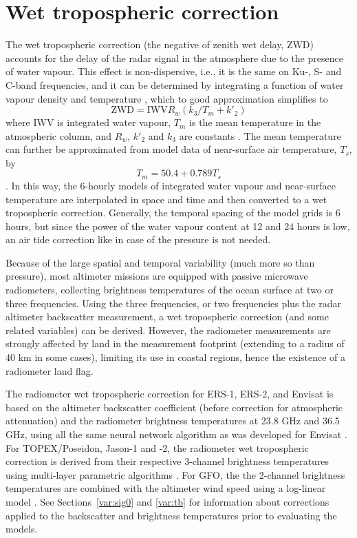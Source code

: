 \documentclass[a4paper,11pt,openany,natbib]{thesis}
\begin{document}
\section{Wet tropospheric correction}
\label{var:wet_tropo}
The wet tropospheric correction (the negative of zenith wet delay, ZWD) accounts for the delay of the radar signal in the atmosphere due to the presence of water vapour. This effect is non-dispersive, i.e., it is the same on Ku-, S- and C-band frequencies, and it can be determined by integrating a function of water vapour density and temperature \citep[e.g.,][]{askne1987}, which to good approximation simplifies to
$$ \mathrm{ZWD} = \mathrm{IWV} R_w (k_3 / T_m + k'_2) $$
where IWV is integrated water vapour, $T_m$ is the mean temperature in the atmospheric column, and $R_w$, $k'_2$ and $k_3$ are constants \citep{bevis1994}. The mean temperature can further be approximated from model data of near-surface air temperature, $T_s$, by
$$ T_m = 50.4 + 0.789 T_s$$
\citep{mendes2000}. In this way, the 6-hourly models of integrated water vapour and near-surface temperature are interpolated in space and time and then converted to a wet tropospheric correction.
Generally, the temporal spacing of the model grids is 6 hours, but since the power of the water vapour content at 12 and 24 hours is low, an air tide correction like in case of the pressure is not needed.

Because of the large spatial and temporal variability (much more so than pressure), most altimeter missions are equipped with passive microwave radiometers, collecting brightness temperatures of the ocean surface at two or three frequencies. Using the three frequencies, or two frequencies plus the radar altimeter backscatter measurement, a wet tropospheric correction (and some related variables) can be derived. However, the radiometer measurements are strongly affected by land in the measurement footprint (extending to a radius of 40 km in some cases), limiting its use in coastal regions, hence the existence of a radiometer land flag.

The radiometer wet tropospheric correction for ERS-1, ERS-2, and Envisat is based on the altimeter backscatter coefficient (before correction for atmospheric attenuation) and the radiometer brightness temperatures at 23.8 GHz and 36.5 GHz, using all the same neural network algorithm as was developed for Envisat \citep{labroue2003}. For TOPEX/Poseidon, Jason-1 and -2, the radiometer wet tropospheric correction is derived from their respective 3-channel brightness temperatures using multi-layer parametric algorithms  \citep{ruf1995c,dumont2001}. For GFO, the the 2-channel brightness temperatures are combined with the altimeter wind speed using a log-linear model \citep{ruf1996}. See Sections~\ref{var:sig0} and \ref{var:tb} for information about corrections applied to the backscatter and brightness temperatures prior to evaluating the models.
\end{document}
